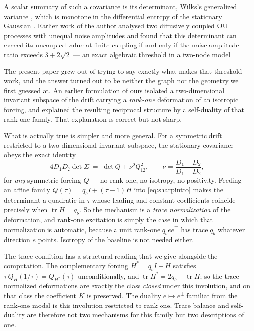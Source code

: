 \documentclass[11pt]{article}
\theoremstyle{plain}
\theoremstyle{definition}
\theoremstyle{remark}
\newcommand{\tr}{\operatorname{tr}}
\newcommand{\Sig}{\Sigma}
\newcommand{\eperp}{e^{\perp}}
\newcommand{\T}{^{\!\top}}
\begin{document}
A scalar summary of such a covariance is its determinant, Wilks's generalized variance
\cite{Wilks1932}, which is monotone in the differential entropy of the stationary Gaussian
\cite{CoverThomas2005}. Earlier work of the author \cite{DeJesus2026ou} analysed two diffusively
coupled OU processes with unequal noise amplitudes and found that this determinant can exceed
its uncoupled value at finite coupling if and only if the noise-amplitude ratio exceeds
$3+2\sqrt2$ --- an exact algebraic threshold in a two-node model.

The present paper grew out of trying to say exactly what makes that threshold work, and the
answer turned out to be neither the graph nor the geometry we first guessed at. An earlier
formulation of ours isolated a two-dimensional invariant subspace of the drift carrying a
\emph{rank-one} deformation of an isotropic forcing, and explained the resulting reciprocal
structure by a self-duality of that rank-one family. That explanation is correct but not sharp.

What is actually true is simpler and more general. For a symmetric drift restricted to a
two-dimensional invariant subspace, the stationary covariance obeys the exact identity
\begin{equation}
  4D_1D_2\det\Sig \;=\; \det Q + \nu^2Q_{12}^2,
  \qquad \nu=\frac{D_1-D_2}{D_1+D_2}, \label{eq:sharpintro}
\end{equation}
for \emph{any} symmetric forcing $Q$ --- no rank-one, no isotropy, no positivity. Feeding an
affine family $Q(\tau)=q_bI+(\tau-1)H$ into \eqref{eq:sharpintro} makes the determinant a
quadratic in $\tau$ whose leading and constant coefficients coincide precisely when
$\tr H=q_b$. So the mechanism is a \emph{trace normalization} of the deformation, and rank-one
excitation is simply the case in which that normalization is automatic, because a unit rank-one
$q_bee\T$ has trace $q_b$ whatever direction $e$ points. Isotropy of the baseline is not needed
either.

The trace condition has a structural reading that we give alongside the computation. The
complementary forcing $H^{*}=q_bI-H$ satisfies $\tau\,Q_H(1/\tau)=Q_{H^{*}}(\tau)$
unconditionally, and $\tr H^{*}=2q_b-\tr H$; so the trace-normalized deformations are exactly
the class \emph{closed} under this involution, and on that class the coefficient $K$ is
preserved. The duality $e\mapsto\eperp$ familiar from the rank-one model is this involution
restricted to rank one. Trace balance and self-duality are therefore not two mechanisms for this
family but two descriptions of one.
\end{document}
